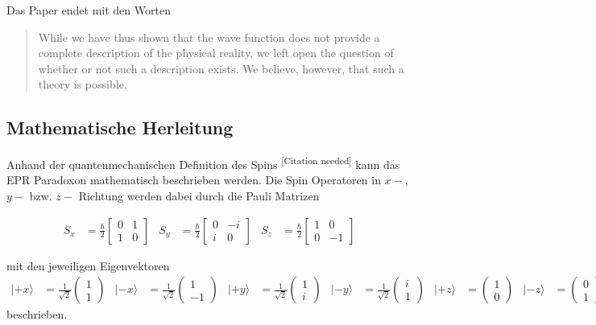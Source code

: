 \begin{refsection}
Das Paper endet mit den Worten
\begin{quote}
    While we have thus shown that the wave function does not provide
    a complete description of the physical reality, we left open the
    question of whether or not such a description exists.
    We believe, however, that such a theory is possible.
\end{quote}

\subsection{Mathematische Herleitung}
Anhand der quantenmechanischen Definition des Spins
\textsuperscript{[Citation needed]}
kann das EPR Paradoxon mathematisch beschrieben werden.
Die Spin Operatoren in $x-$, $y-$ bzw. $z-$ Richtung werden dabei durch
die Pauli Matrizen 

\begin{align*}
    S_x &= \frac{\hbar}{2} \begin{bmatrix}
    0 & 1 \\ 1 & 0
    \end{bmatrix}
    &
    S_y &= \frac{\hbar}{2} \begin{bmatrix}
    0 & -i \\ i & 0
    \end{bmatrix}
    &
    S_z &= \frac{\hbar}{2} \begin{bmatrix}
    1 & 0 \\ 0 & -1
    \end{bmatrix}
\end{align*}

mit den jeweiligen Eigenvektoren
\begin{align*}
    |{+}x\rangle &= \frac{1}{\sqrt{2}}\begin{pmatrix} 1\\1 \end{pmatrix} &
    |{-}x\rangle &= \frac{1}{\sqrt{2}}\begin{pmatrix} 1\\-1 \end{pmatrix} &
    |{+}y\rangle &= \frac{1}{\sqrt{2}}\begin{pmatrix} 1\\i \end{pmatrix} &
    |{-}y\rangle &= \frac{1}{\sqrt{2}}\begin{pmatrix} i\\1 \end{pmatrix} &
    |{+}z\rangle &= \begin{pmatrix} 1\\0 \end{pmatrix} &
    |{-}z\rangle &= \begin{pmatrix} 0\\1 \end{pmatrix} &
\end{align*}
beschrieben.


\end{refsection}
